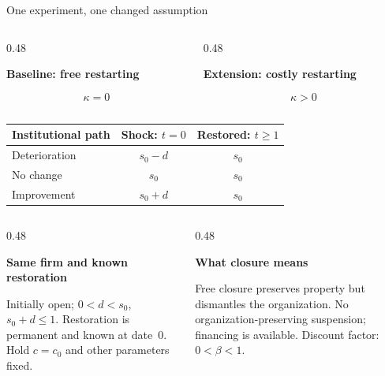 \documentclass[aspectratio=169,11pt]{beamer}
\newcommand{\kwTurq}[1]{{\color{turquoise}#1}}
\newcommand{\labeltext}[1]{{\small\bfseries\color{blue}#1\par}\vspace{1.5mm}}
\newcommand{\panel}[3]{\begingroup\setlength{\fboxsep}{2.5mm}\colorbox{#1}{\begin{minipage}[t]{\dimexpr#2-5mm\relax}\raggedright #3\end{minipage}}\endgroup}
\begin{document}
\begin{frame}{One experiment, \kwTurq{one changed assumption}}
 \begin{columns}[T,onlytextwidth]
 \begin{column}{0.48\textwidth}\panel{pale}{\linewidth}{\labeltext{Baseline: free restarting}\[\kappa=0\]}\end{column}
 \begin{column}{0.48\textwidth}\panel{paleteal}{\linewidth}{\labeltext{Extension: costly restarting}\[\kappa>0\]}\end{column}
 \end{columns}
 \vspace{3mm}
 {\centering\small\renewcommand{\arraystretch}{1.3}
 \begin{tabular}{@{}lcc@{}}\toprule
 Institutional path & Shock: $t=0$ & Restored: $t\geq1$\\\midrule
 Deterioration & $s_0-d$ & $s_0$\\
 No change & $s_0$ & $s_0$\\
 Improvement & $s_0+d$ & $s_0$\\\bottomrule
 \end{tabular}\par}
 \vspace{4mm}
 \begin{columns}[T,onlytextwidth]
 \begin{column}{0.48\textwidth}
 \labeltext{Same firm and known restoration}
 \small Initially open; $0<d<s_0$, $s_0+d\leq1$. Restoration is permanent and known at date~0.
 Hold $c=c_0$ and other parameters fixed.
 \end{column}
 \begin{column}{0.48\textwidth}
 \labeltext{What closure means}
 \small Free closure preserves property but dismantles the organization. No organization-preserving suspension;
 financing is available. Discount factor: $0<\beta<1$.
 \end{column}
 \end{columns}
\end{frame}
\end{document}

